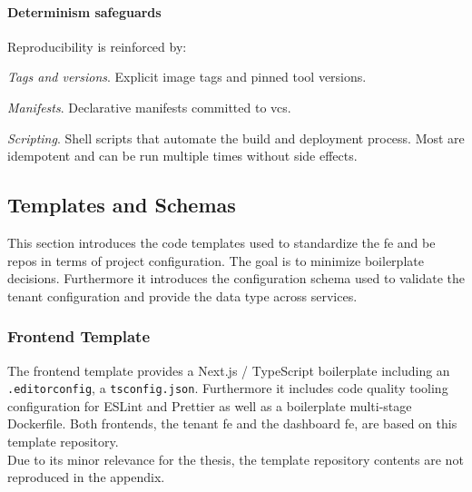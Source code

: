 \documentclass[11pt, a4paper, oneside, listof=totoc]{scrartcl}
\begin{document}
            \paragraph{Determinism safeguards}
                Reproducibility is reinforced by:
                \begin{enumerate}[label={[\arabic*]:},
                    ref=Challenge~\arabic*,
                    leftmargin=*,
                    itemsep=0.6\baselineskip]

                    \item\label{chal:pinned}
                        \textit{Tags and versions}.
                        Explicit image tags and pinned tool versions.
                        
                    \item\label{chal:manifests}
                        \textit{Manifests}.
                        Declarative manifests committed to \gls{vcs}.

                    \item\label{chal:scripting}
                        \textit{Scripting}.
                        Shell scripts that automate the build and deployment process.
                        Most are idempotent and can be run multiple times without side effects.

                \end{enumerate}

    \clearpage

        \subsection{Templates and Schemas}\label{subsec:templatesAndSchemas}
            This section introduces the code templates used to standardize the \gls{fe} and \gls{be}
            repos in terms of project configuration.
            The goal is to minimize boilerplate decisions.
            Furthermore it introduces the configuration schema used to validate the tenant
            configuration and provide the data type across services.

            \subsubsection{Frontend Template}\label{subsubsec:frontendTemplate}
                The frontend template provides a Next.js / TypeScript boilerplate including an
                \texttt{.editorconfig}, a \texttt{tsconfig.json}.
                Furthermore it includes code quality tooling configuration for ESLint and Prettier
                as well as a boilerplate multi-stage Dockerfile.
                Both frontends, the tenant \gls{fe} and the dashboard \gls{fe}, are based on this
                template repository.\\
                Due to its minor relevance for the thesis, the template repository contents are not
                reproduced in the appendix.
\end{document}
